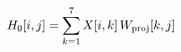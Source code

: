 \documentclass[preview]{standalone}
\begin{document}
\begin{align*}
\special{dvisvgm:raw <g id='unique000'>}H_0[i, j] = \sum_{k=1}^{7} X[i, k]\, W_{\mathrm{proj}}[k, j]\special{dvisvgm:raw </g>}
\end{align*}
\end{document}
